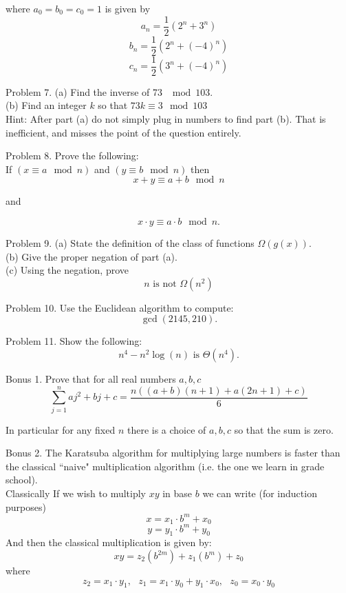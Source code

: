 \documentclass[16 pt]{amsart}
\theoremstyle{definition}
\theoremstyle{remark}
\numberwithin{equation}{subsection}
\begin{document}
where $a_0=b_0=c_0=1$ is given by
\[
a_n = \frac{1}{2}(2^n+3^n)
\]
\[
b_n = \frac{1}{2}(2^n + (-4)^n)
\]
\[
c_n = \frac{1}{2}(3^n+(-4)^n)
\]
\newpage 

Problem 7. (a) Find the inverse of 73 $\mod{103}$.\\


(b) Find an integer $k$ so that $73k \equiv 3 \mod{103}$\\

Hint: After part (a) do not simply plug in numbers to find part (b).  That is inefficient, and misses the point of the question entirely.

\newpage

Problem 8. Prove the following:\\
If $(x\equiv a \mod{n})$ and $(y\equiv b\mod{n})$ then
\[
x+y \equiv a+b \mod{n}
\]
\begin{center} and \end{center}
\[
x\cdot y \equiv a\cdot b \mod{n}.
\]

\newpage

Problem 9. (a) State the definition of the class of functions $\Omega(g(x))$.\\

(b) Give the proper negation of part (a).\\

(c) Using the negation, prove
\[
n \text{ is not } \Omega(n^2)
\]

\newpage


Problem 10. Use the Euclidean algorithm to compute:
\[
\gcd(2145,210).
\]

\vspace{2.5in}

Problem 11. Show the following:
\[
n^4-n^2\log(n) \text{ is } \Theta(n^4).
\]

\newpage

Bonus 1. Prove that for all real numbers $a,b,c$ 
\[
\sum_{j=1}^{n} aj^2 + bj + c = \frac{n((a+b)(n+1)+a(2n+1)+c)}{6}
\]

In particular for any fixed $n$ there is a choice of $a,b,c$ so that the sum is zero.

\vspace{1in}

Bonus 2. The Karatsuba algorithm for multiplying large numbers is faster than the classical ``naive" multiplication algorithm (i.e. the one we learn in grade school).\\  
Classically If we wish to multiply $xy$ in base $b$ we can write (for induction purposes) 
\[
x = x_1\cdot b^m + x_0
\]
\[
y = y_1\cdot b^m + y_0
\]
And then the classical multiplication is given by:
\[
xy = z_2(b^{2m}) + z_1(b^m) + z_0
\]
where
\[
z_2 = x_1\cdot y_1, \text{ } z_1 = x_1\cdot y_0 + y_1\cdot x_0, \text{ } z_0 = x_0\cdot y_0
\]
\end{document}

